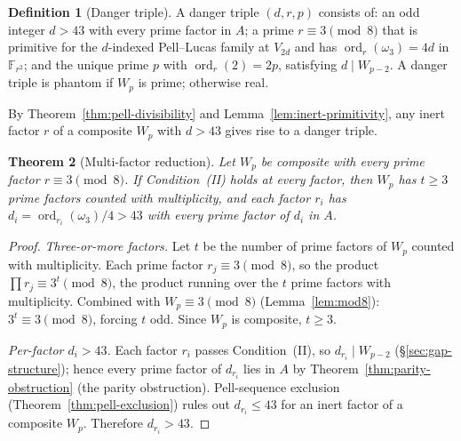 \documentclass[11pt]{amsart}
\theoremstyle{plain}
\newtheorem{theorem}{Theorem}[section]
\theoremstyle{definition}
\newtheorem{definition}[theorem]{Definition}
\theoremstyle{remark}
\numberwithin{equation}{section}
\newcommand{\ord}{\operatorname{ord}}
\newcommand{\F}{\mathbb{F}}
\begin{document}
\begin{definition}[Danger triple]\label{def:danger-triple}
A danger triple $(d, r, p)$ consists of: an odd integer $d > 43$ with every prime factor in $A$; a prime $r \equiv 3 \pmod 8$ that is primitive for the $d$-indexed Pell--Lucas family at $V_{2 d}$ and has $\ord_r(\omega_3) = 4 d$ in $\F_{r^2}$; and the unique prime $p$ with $\ord_r(2) = 2 p$, satisfying $d \mid W_{p-2}$. A danger triple is phantom if $W_p$ is prime; otherwise real.
\end{definition}

By Theorem~\ref{thm:pell-divisibility} and Lemma~\ref{lem:inert-primitivity}, any inert factor $r$ of a composite $W_p$ with $d > 43$ gives rise to a danger triple.

\begin{theorem}[Multi-factor reduction]\label{thm:multi-factor}
Let $W_p$ be composite with every prime factor $r \equiv 3 \pmod 8$. If Condition~(II) holds at every factor, then $W_p$ has $t \geq 3$ prime factors counted with multiplicity, and each factor $r_i$ has $d_i = \ord_{r_i}(\omega_3)/4 > 43$ with every prime factor of $d_i$ in $A$.
\end{theorem}

\begin{proof}
\emph{Three-or-more factors.} Let $t$ be the number of prime factors of $W_p$ counted with multiplicity. Each prime factor $r_j \equiv 3 \pmod 8$, so the product $\prod r_j \equiv 3^t \pmod 8$, the product running over the $t$ prime factors with multiplicity. Combined with $W_p \equiv 3 \pmod 8$ (Lemma~\ref{lem:mod8}): $3^t \equiv 3 \pmod 8$, forcing $t$ odd. Since $W_p$ is composite, $t \geq 3$.

\emph{Per-factor $d_i > 43$.} Each factor $r_i$ passes Condition~(II), so $d_{r_i} \mid W_{p-2}$ (\S\ref{sec:gap-structure}); hence every prime factor of $d_{r_i}$ lies in $A$ by Theorem~\ref{thm:parity-obstruction} (the parity obstruction). Pell-sequence exclusion (Theorem~\ref{thm:pell-exclusion}) rules out $d_{r_i} \leq 43$ for an inert factor of a composite $W_p$. Therefore $d_{r_i} > 43$.
\end{proof}
\end{document}
